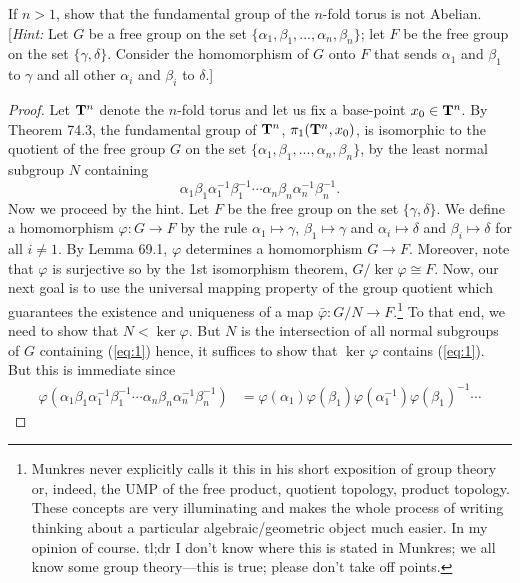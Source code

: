 \begin{problem}[Munkres \S74, Ex.\,6]
If $n>1$, show that the fundamental group of the $n$-fold torus is not
Abelian. [\emph{Hint:} Let $G$ be a free group on the set
$\{\alpha_1,\beta_1,...,\alpha_n,\beta_n\}$; let $F$ be the free group on
the set $\{\gamma,\delta\}$. Consider the homomorphism of $G$ onto $F$ that
sends $\alpha_1$ and $\beta_1$ to $\gamma$ and all other $\alpha_i$ and
$\beta_i$ to $\delta$.]
\end{problem}
\begin{proof}
Let $\mathbf{T}^n$ denote the $n$-fold torus and let us fix a base-point
$x_0\in\mathbf{T}^n$. By Theorem 74.3, the fundamental group of $\mathbf{T}^n$,
$\pi_1(\mathbf{T}^n,x_0)$, is isomorphic to the quotient of the free group $G$ on
the set $\{\alpha_1,\beta_1,...,\alpha_n,\beta_n\}$, by the least normal
subgroup $N$ containing
\begin{equation}
\label{eq:1}
\alpha_1\beta_1\alpha_1^{-1}\beta_1^{-1}
\cdots
\alpha_n\beta_n\alpha_n^{-1}\beta_n^{-1}.
\end{equation}
Now we proceed by the hint. Let $F$ be the free group on the set
$\{\gamma,\delta\}$. We define a homomorphism $\varphi\colon G\to F$ by the
rule $\alpha_1\mapsto\gamma$, $\beta_1\mapsto\gamma$ and
$\alpha_i\mapsto\delta$ and $\beta_i\mapsto\delta$ for all $i\neq
1$. By Lemma 69.1, $\varphi$ determines a homomorphism $G\to F$. Moreover,
note that $\varphi$ is surjective so by the 1st isomorphism theorem,
$G/\ker\varphi\cong F$. Now, our next goal is to use the universal mapping
property of the group quotient which guarantees the existence and
uniqueness of a map $\bar\varphi\colon G/N\to F$.\footnote{Munkres never
explicitly calls it this in his short exposition of group theory or,
indeed, the UMP of the free product, quotient topology, product
topology. These concepts are very illuminating and makes the whole process
of writing thinking about a particular algebraic/geometric object much
easier. In my opinion of course. tl;dr I don't know where this is stated in
Munkres; we all know some group theory---this is true; please don't take
off points.} To that end, we need to show that $N<\ker\varphi$. But $N$ is
the intersection of all normal subgroups of $G$ containing (\ref{eq:1})
hence, it suffices to show that $\ker\varphi$ contains (\ref{eq:1}). But
this is immediate since
\begin{align*}
\varphi(
\alpha_1\beta_1\alpha_1^{-1}\beta_1^{-1}
\cdots
\alpha_n\beta_n\alpha_n^{-1}\beta_n^{-1})
&=\varphi(\alpha_1)\varphi(\beta_1)\varphi(\alpha_1^{-1})\varphi(\beta_1)^{-1}\cdots

\end{align*}
\end{proof}
